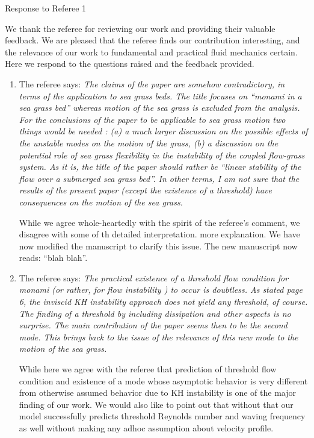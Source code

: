 \documentclass[letterpaper,10pt]{article}
\begin{document}
\centerline{Response to Referee 1}
We thank the referee for reviewing our work and providing their valuable feedback. 
We are pleased that the referee finds our contribution interesting, and the relevance of our work to fundamental and practical fluid mechanics certain.
Here we respond to the questions raised and the feedback provided.

\begin{enumerate}
\item The referee says:
\textit{
The claims of the paper are somehow contradictory, in terms of the application to sea grass beds. The title focuses on “monami in a sea grass bed” whereas motion of the sea grass is excluded from the analysis.  For the conclusions of the paper to be applicable to sea grass motion two things would be needed : (a) a much larger discussion on the possible effects of the unstable modes on the motion of the grass, (b) a discussion on the potential role of sea grass flexibility in the instability of the coupled flow-grass system. As it is, the  title of the paper should rather  be “linear stability of the flow over a submerged sea grass bed”. In other terms, I am not sure that the results of the present paper (except the existence of a threshold) have consequences on the motion of the sea grass.
}

While we agree whole-heartedly with the spirit of the referee's comment, we disagree with some of th detailed interpretation. more explanation. We have now modified the manuscript to clarify this issue. The new manuscript now reads: ``blah blah''.

\item The referee says:
\textit{
The practical existence of a threshold flow condition for monami (or rather,  for flow instability ) to occur is doubtless.  As stated page 6, the inviscid KH instability approach does not yield any threshold, of course. The finding of a threshold by including dissipation and other aspects is no surprise. The main contribution of the paper seems then to be the second mode. This brings back to the issue of the relevance of this new mode to the motion of the sea grass.
}

While here we agree with the referee that prediction of threshold flow condition and existence of a mode whose asymptotic behavior is very different from otherwise assumed behavior due to KH instability is one of the major finding of our work. We would also like to point out that without that our model successfully predicts threshold Reynolds number and  waving frequency  as well without making any adhoc assumption about velocity profile. 


\end{enumerate}
\end{document}
